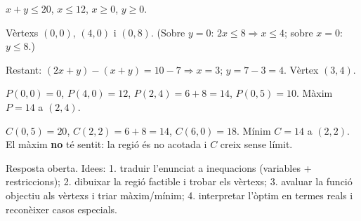 \begin{solucions}
\begin{sollist}
  \item $x+y\le 20$, \;$x\le 12$, \;$x\ge 0$, \;$y\ge 0$.
  \item Vèrtexs $(0,0)$, $(4,0)$ i $(0,8)$. (Sobre $y=0$: $2x\le 8\Rightarrow x\le 4$;
        sobre $x=0$: $y\le 8$.)
  \item Restant: $(2x+y)-(x+y)=10-7\Rightarrow x=3$; $y=7-3=4$. Vèrtex $(3,4)$.
  \item $P(0,0)=0$, $P(4,0)=12$, $P(2,4)=6+8=14$, $P(0,5)=10$. Màxim $P=14$ a $(2,4)$.
  \item $C(0,5)=20$, $C(2,2)=6+8=14$, $C(6,0)=18$. Mínim $C=14$ a $(2,2)$. El màxim
        \textbf{no} té sentit: la regió és no acotada i $C$ creix sense límit.
  \item Resposta oberta. Idees: 1. traduir l'enunciat a inequacions (variables +
        restriccions); 2. dibuixar la regió factible i trobar els vèrtexs; 3. avaluar
        la funció objectiu als vèrtexs i triar màxim/mínim; 4. interpretar l'òptim en
        termes reals i reconèixer casos especials.
\end{sollist}
\end{solucions}
